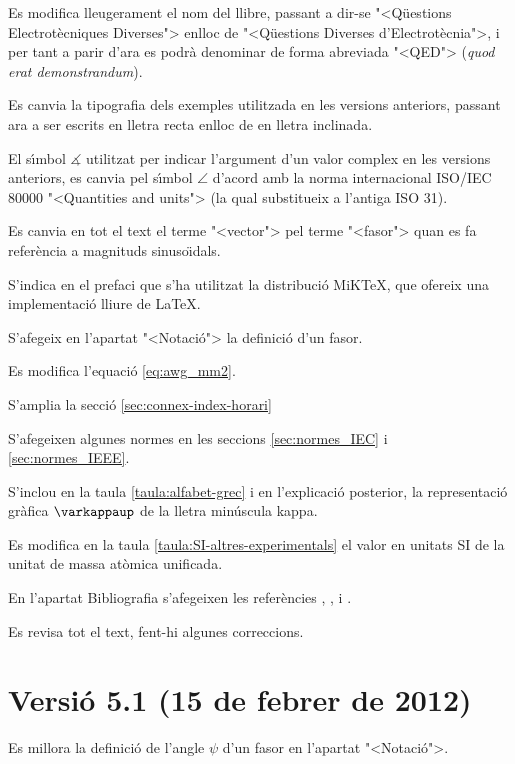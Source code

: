 Es modifica lleugerament el nom del llibre, passant a dir-se {"<}Q\"{u}estions Electrot\`{e}cniques Diverses{">} enlloc de {"<}Q\"{u}estions Diverses d'Electrot\`{e}cnia{">}, i per tant a parir d'ara es podr\`{a} denominar de forma abreviada {"<}QED{">} (\emph{quod erat demonstrandum}).

Es canvia la tipografia dels exemples utilitzada en les versions anteriors, passant ara a ser escrits en lletra recta enlloc de en lletra inclinada.

El s\'{\i}mbol $\measuredangle$ utilitzat per indicar l'argument d'un valor complex en les versions anteriors, es canvia pel s\'{\i}mbol $\angle$ d'acord amb la norma internacional \textsf{ISO/IEC 80000} {"<}Quantities and units{">} (la qual substitueix a l'antiga \textsf{ISO 31}).

Es canvia en tot el text el terme {"<}vector{">} pel terme {"<}fasor{">} quan es fa refer\`{e}ncia a magnituds sinuso\"{\i}dals.

S'indica en el prefaci que s'ha utilitzat la distribuci\'{o} MiK\TeX, que ofereix una implementaci\'{o} lliure de \LaTeX.

S'afegeix en l'apartat {"<}Notaci\'{o}{">} la definici\'{o} d'un fasor.

Es modifica l'equaci\'{o} \eqref{eq:awg_mm2}.

S'amplia la secci\'{o} \ref{sec:connex-index-horari}

S'afegeixen algunes normes en les seccions \ref{sec:normes_IEC} i \ref{sec:normes_IEEE}.

S'inclou en la taula \ref{taula:alfabet-grec} i en l'explicaci\'{o} posterior, la representaci\'{o} gr\`{a}fica $\varkappaup$ de la lletra min\'{u}scula kappa.

Es modifica en la taula \ref{taula:SI-altres-experimentals} el valor en unitats SI de la unitat de massa at\`{o}mica unificada.

En l'apartat Bibliografia s'afegeixen les refer\`{e}ncies \cite{GRZ}, \cite{DUN}, \cite{REI} i \cite{TLE}.

Es revisa tot el text, fent-hi algunes correccions.

\section*{Versi\'{o} 5.1 (15 de febrer de 2012)}

Es millora la definici\'{o} de l'angle $\psi$ d'un fasor en l'apartat {"<}Notaci\'{o}{">}.

